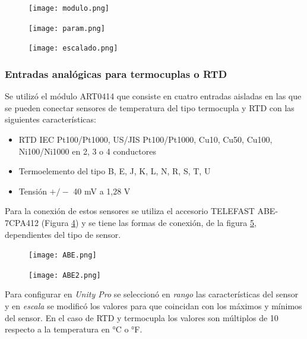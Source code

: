 \begin{figure}[H]
	\centering
	\texttt{[image: modulo.png]}
	\label{fig:modulo}
\end{figure}
\begin{figure}[H]
	\centering
	\texttt{[image: param.png]}
	\label{fig:param}
\end{figure}

\begin{figure}[H]
	\centering
	\texttt{[image: escalado.png]}
	\label{fig:escalado}
\end{figure}


\subsubsection{Entradas analógicas para termocuplas o RTD}
Se utilizó el módulo ART0414 que consiste en cuatro entradas aisladas en las que se pueden conectar sensores de temperatura del tipo termocupla y RTD con las siguientes características:
\begin{itemize}
	\item RTD IEC Pt100/Pt1000, US/JIS Pt100/Pt1000, Cu10, Cu50, Cu100, Ni100/Ni1000 en 2, 3 o 4 conductores
	\item Termoelemento del tipo B, E, J, K, L, N, R, S, T, U
\item 	Tensión $+/-$ 40 mV a 1,28 V
	
\end{itemize}

Para la conexión de estos sensores se utiliza el accesorio TELEFAST ABE-7CPA412 (Figura \ref{fig:ABE}) y se tiene las formas de conexión, de la figura \ref{fig:ABE2}, dependientes del tipo de sensor.

\begin{figure}[H]
	\centering
	\texttt{[image: ABE.png]}
	\label{fig:ABE}
\end{figure}
\begin{figure}[H]
	\centering
	\texttt{[image: ABE2.png]}
	\label{fig:ABE2}
\end{figure}

Para configurar en \textit{Unity Pro} se seleccionó en \textit{rango} las características del sensor y en \textit{escala} se modificó los valores para que coincidan con los máximos y mínimos del sensor. En el caso de RTD y termocupla los valores son múltiplos de 10 respecto a la temperatura en °C o °F. 

